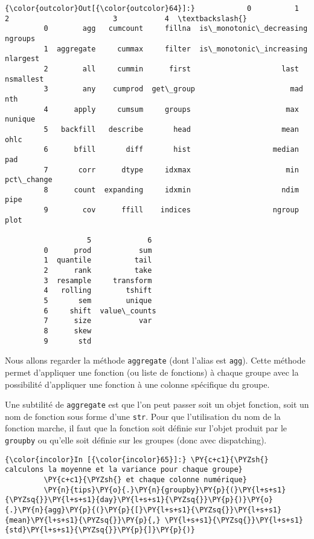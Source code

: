 \begin{Verbatim}[commandchars=\\\{\}]
{\color{outcolor}Out[{\color{outcolor}64}]:}            0          1          2                        3           4  \textbackslash{}
         0        agg   cumcount     fillna  is\_monotonic\_decreasing     ngroups   
         1  aggregate     cummax     filter  is\_monotonic\_increasing    nlargest   
         2        all     cummin      first                     last   nsmallest   
         3        any    cumprod  get\_group                      mad         nth   
         4      apply     cumsum     groups                      max     nunique   
         5   backfill   describe       head                     mean        ohlc   
         6      bfill       diff       hist                   median         pad   
         7       corr      dtype     idxmax                      min  pct\_change   
         8      count  expanding     idxmin                     ndim        pipe   
         9        cov      ffill    indices                   ngroup        plot   
         
                   5             6  
         0      prod           sum  
         1  quantile          tail  
         2      rank          take  
         3  resample     transform  
         4   rolling        tshift  
         5       sem        unique  
         6     shift  value\_counts  
         7      size           var  
         8      skew                
         9       std                
\end{Verbatim}
            
    Nous allons regarder la méthode \texttt{aggregate} (dont l'alias est
\texttt{agg}). Cette méthode permet d'appliquer une fonction (ou liste
de fonctions) à chaque groupe avec la possibilité d'appliquer une
fonction à une colonne spécifique du groupe.

Une subtilité de \texttt{aggregate} est que l'on peut passer soit un
objet fonction, soit un nom de fonction sous forme d'une \texttt{str}.
Pour que l'utilisation du nom de la fonction marche, il faut que la
fonction soit définie sur l'objet produit par le \texttt{groupby} ou
qu'elle soit définie sur les groupes (donc avec dispatching).

    \begin{Verbatim}[commandchars=\\\{\}]
{\color{incolor}In [{\color{incolor}65}]:} \PY{c+c1}{\PYZsh{} calculons la moyenne et la variance pour chaque groupe}
         \PY{c+c1}{\PYZsh{} et chaque colonne numérique}
         \PY{n}{tips}\PY{o}{.}\PY{n}{groupby}\PY{p}{(}\PY{l+s+s1}{\PYZsq{}}\PY{l+s+s1}{day}\PY{l+s+s1}{\PYZsq{}}\PY{p}{)}\PY{o}{.}\PY{n}{agg}\PY{p}{(}\PY{p}{[}\PY{l+s+s1}{\PYZsq{}}\PY{l+s+s1}{mean}\PY{l+s+s1}{\PYZsq{}}\PY{p}{,} \PY{l+s+s1}{\PYZsq{}}\PY{l+s+s1}{std}\PY{l+s+s1}{\PYZsq{}}\PY{p}{]}\PY{p}{)}
\end{Verbatim}


